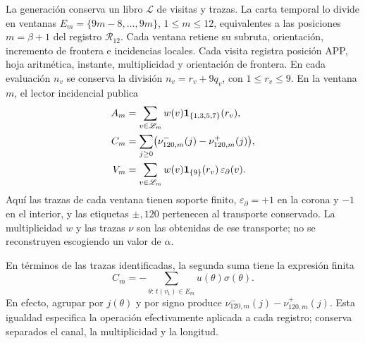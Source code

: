 La generación conserva un libro \(\mathscr L\) de visitas y trazas.
La carta temporal lo divide en ventanas
\(E_m=\{9m-8,\ldots,9m\}\), \(1\le m\le12\),
equivalentes a las posiciones \(m=\beta+1\) del registro
\(\mathcal R_{12}\). Cada ventana retiene su subruta,
orientación, incremento de frontera e incidencias locales.
Cada visita registra posición APP, hoja aritmética, instante, multiplicidad
y orientación de frontera. En cada evaluación \(n_v\) se conserva la
división \(n_v=r_v+9q_v\), con \(1\le r_v\le9\). En la ventana
\(m\), el lector incidencial publica
\begin{align}
 A_m&=\sum_{v\in\mathscr L_m}w(v)
      \mathbf1_{\{1,3,5,7\}}(r_v),\notag\\
 C_m&=\sum_{j\ge0}
       \bigl(\nu^-_{120,m}(j)-\nu^+_{120,m}(j)\bigr),\notag\\
 V_m&=\sum_{v\in\mathscr L_m}w(v)
      \mathbf1_{\{9\}}(r_v)\,\varepsilon_{\partial}(v).
 \label{vi:dep:incidencias}
\end{align}
Aquí las trazas de cada ventana tienen soporte finito,
\(\varepsilon_{\partial}=+1\) en la corona y \(-1\) en el interior,
y las etiquetas \(\pm,120\) pertenecen al transporte conservado.
La multiplicidad \(w\) y las trazas \(\nu\) son las obtenidas de ese
transporte; no se reconstruyen escogiendo un valor de \(\alpha\).

En términos de las trazas identificadas, la segunda suma tiene la
expresión finita
\[
 C_m=-\sum_{\theta:\,t(v_1)\in E_m}u(\theta)\sigma(\theta).
\]
En efecto, agrupar por \(j(\theta)\) y por signo produce
\(\nu^-_{120,m}(j)-\nu^+_{120,m}(j)\). Esta igualdad especifica
la operación efectivamente aplicada a cada registro; conserva
separados el canal, la multiplicidad y la longitud.

